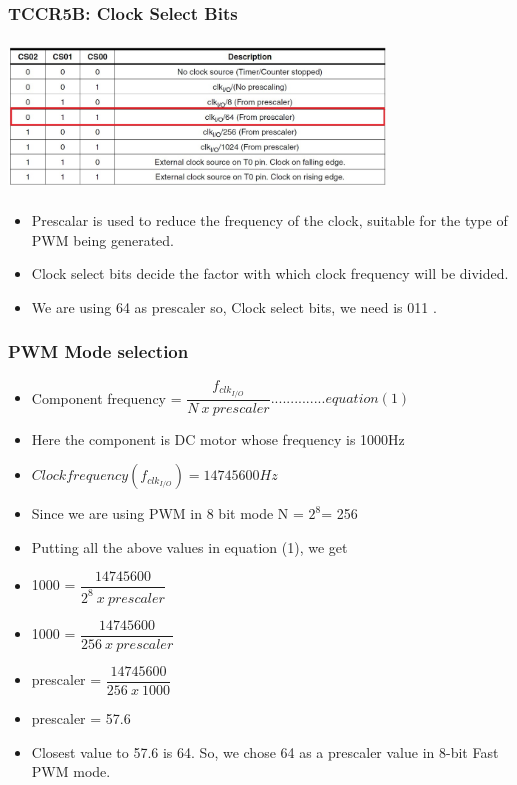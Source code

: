 \documentclass[table,10pt,red]{beamer}	%
\begin{document}
\begin{frame}
	\frametitle{TCCR5B: Clock Select Bits}
	\begin{center}
		\includegraphics[height=4cm, width=10cm]{cs_bits}
		\begin{itemize}
			\item <+-|alert@+> Prescalar is used to reduce the frequency of the clock, suitable for the type of PWM being generated.
			\item <+-|alert@+> Clock select bits decide the factor with which clock frequency will be divided.
			\item <+-|alert@+> We are using 64 as prescaler so, Clock select bits, we need is 011 .			
		\end{itemize}
	\end{center}
\end{frame}
\begin{frame}
	\frametitle{PWM Mode selection}
	\begin{itemize}
		\item <+-|alert@+> Component frequency = $\dfrac{f_{clk_{I/O}}} {N\ x\ prescaler} ..............equation(1)$	
	    \item <+-|alert@+> Here the component is DC motor whose frequency is 1000Hz
		\item <+-|alert@+> $Clock frequency(f_{clk_{I/O}})  = 14745600Hz$
		
		\item <+-|alert@+> Since we are using PWM in 8 bit mode N = $2^8 $= 256
		
		\item <+-|alert@+> Putting all the above values in equation (1), we get
		
		\item <+-|alert@+> 1000 =
		$\dfrac{14745600}{2^8\ x\ prescaler}$
		
		\item  <+-|alert@+>  1000 = $\dfrac{14745600}{256\ x\ prescaler}$
		
		\item <+-|alert@+> prescaler = $\dfrac{14745600}{256\ x\ 1000}$
		\item <+-|alert@+> prescaler = 57.6
		
		\item <+-|alert@+> Closest value to 57.6 is 64. So, we chose 64 as a prescaler value in 8-bit Fast PWM mode.
		
	\end{itemize}
\end{frame}
\end{document}
